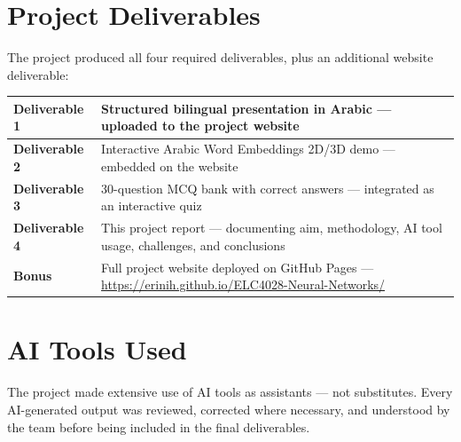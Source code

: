 \section{Project Deliverables}

The project produced all four required deliverables, plus an additional website deliverable:

\begin{table}[h!]
    \centering
    \begin{tabular}{|l|p{12cm}|}
        \hline
        \textbf{Deliverable 1} & Structured bilingual presentation in Arabic — uploaded to the project website \\
        \hline
        \textbf{Deliverable 2} & Interactive Arabic Word Embeddings 2D/3D demo — embedded on the website \\
        \hline
        \textbf{Deliverable 3} & 30-question MCQ bank with correct answers — integrated as an interactive quiz \\
        \hline
        \textbf{Deliverable 4} & This project report — documenting aim, methodology, AI tool usage, challenges, and conclusions \\
        \hline
        \textbf{Bonus} & Full project website deployed on GitHub Pages — \url{https://erinih.github.io/ELC4028-Neural-Networks/} \\
        \hline
    \end{tabular}
\end{table}

\section{AI Tools Used}

The project made extensive use of AI tools as assistants — not substitutes. Every AI-generated output was reviewed, corrected where necessary, and understood by the team before being included in the final deliverables.

